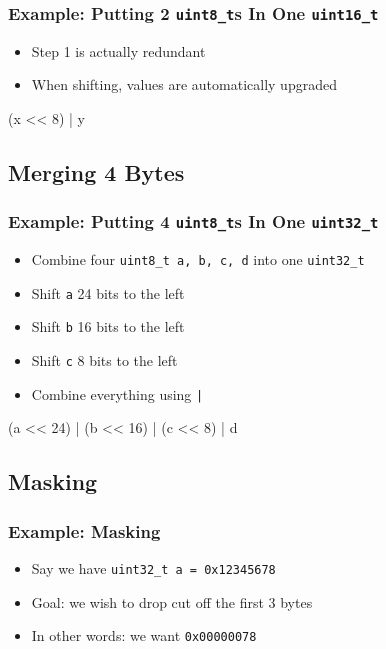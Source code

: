 \begin{frame}
  \frametitle{Example: Putting 2 \texttt{uint8\_t}s In One \texttt{uint16\_t}}
  \begin{itemize}
    \item Step 1 is actually redundant
    \item When shifting, values are automatically upgraded
  \end{itemize}
  \begin{center} \ttfamily
    (x << 8) | y
  \end{center}
\end{frame}

\subsection{Merging 4 Bytes}
\frame{\tableofcontents[currentsubsection]}

\begin{frame}
  \frametitle{Example: Putting 4 \texttt{uint8\_t}s In One \texttt{uint32\_t}}
  \begin{itemize}
    \item Combine four \texttt{uint8\_t a, b, c, d} into one \texttt{uint32\_t}
    \item Shift \texttt{a} 24 bits to the left
    \item Shift \texttt{b} 16 bits to the left
    \item Shift \texttt{c} 8 bits to the left
    \item Combine everything using \texttt{|}
  \end{itemize}
  \begin{center} \ttfamily
    (a << 24) | (b << 16) | (c << 8) | d
  \end{center}
\end{frame}

\subsection{Masking}
\frame{\tableofcontents[currentsubsection]}

\begin{frame}
  \frametitle{Example: Masking}
  \begin{itemize}
    \item Say we have \texttt{uint32\_t a = 0x12345678}
    \item Goal: we wish to drop cut off the first 3 bytes
    \item In other words: we want \texttt{0x00000078}
  \end{itemize}
\end{frame}


